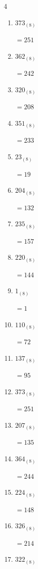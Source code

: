 \begin{multicols}{4}
\begin{enumerate}
  \item $373_{(8)}$

        $=251$

  \item $362_{(8)}$

        $=242$

  \item $320_{(8)}$

        $=208$

  \item $351_{(8)}$

        $=233$

  \item $23_{(8)}$

        $=19$

  \item $204_{(8)}$

        $=132$

  \item $235_{(8)}$

        $=157$

  \item $220_{(8)}$

        $=144$

  \item $1_{(8)}$

        $=1$

  \item $110_{(8)}$

        $=72$

\columnbreak %

  \item $137_{(8)}$

        $=95$

  \item $373_{(8)}$

        $=251$

  \item $207_{(8)}$

        $=135$

  \item $364_{(8)}$

        $=244$

  \item $224_{(8)}$

        $=148$

  \item $326_{(8)}$

        $=214$

  \item $322_{(8)}$


\end{enumerate}
\end{multicols}
